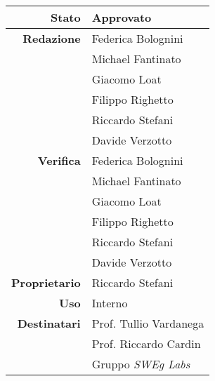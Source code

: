 \thispagestyle{empty} %

\begin{center}
\begin{tabular}{r|l}
    \textbf{Stato} & Approvato \\
    \hline
    \textbf{Redazione} & Federica Bolognini \\
                       & Michael Fantinato \\
                       & Giacomo Loat \\
                       & Filippo Righetto \\
                       & Riccardo Stefani \\
                       & Davide Verzotto \\
    \hline
    \textbf{Verifica} & Federica Bolognini \\
                      & Michael Fantinato \\
                      & Giacomo Loat \\
                      & Filippo Righetto \\
                      & Riccardo Stefani \\
                      & Davide Verzotto \\
    \hline
    \textbf{Proprietario} & Riccardo Stefani \\
    \hline
    \textbf{Uso} & Interno \\
    \hline
    \textbf{Destinatari} & Prof. Tullio Vardanega \\
                         & Prof. Riccardo Cardin \\
                         & Gruppo \emph{SWEg Labs} \\
\end{tabular}
\end{center}
    
